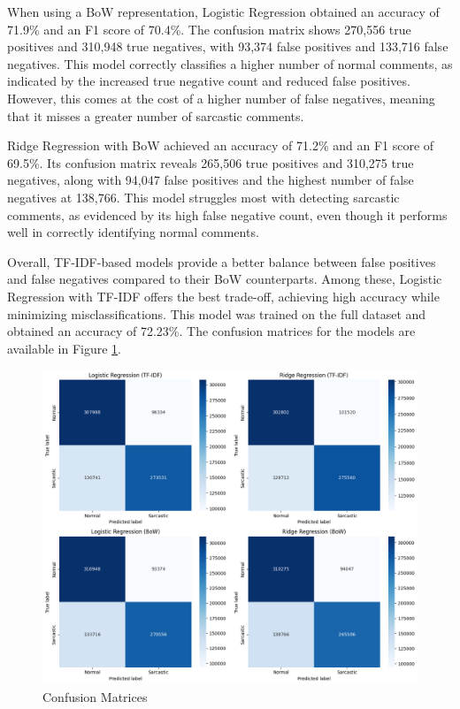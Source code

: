 When using a BoW representation, Logistic Regression obtained an accuracy of 71.9\% and an F1 score of 70.4\%. The confusion matrix shows 270,556 true positives and 310,948 true negatives, 
with 93,374 false positives and 133,716 false negatives. This model correctly classifies a higher number of normal comments, as indicated by the increased true negative count and reduced 
false positives. However, this comes at the cost of a higher number of false negatives, meaning that it misses a greater number of sarcastic comments.

Ridge Regression with BoW achieved an accuracy of 71.2\% and an F1 score of 69.5\%. Its confusion matrix reveals 265,506 true positives and 310,275 true negatives, along with 
94,047 false positives and the highest number of false negatives at 138,766. This model struggles most with detecting sarcastic comments, as evidenced by its high false negative count, 
even though it performs well in correctly identifying normal comments.

Overall, TF-IDF-based models provide a better balance between false positives and false negatives compared to their BoW counterparts. Among these, Logistic Regression with TF-IDF offers 
the best trade-off, achieving high accuracy while minimizing misclassifications. This model was trained on the full dataset and obtained an accuracy of 72.23\%. The confusion matrices 
for the models are available in Figure \ref{Fig_4}.

\begin{figure}
    \centering
    \includegraphics[width=0.8\linewidth]{img/conf_matrix.png}
    \caption{Confusion Matrices}
    \label{Fig_4}
\end{figure}

